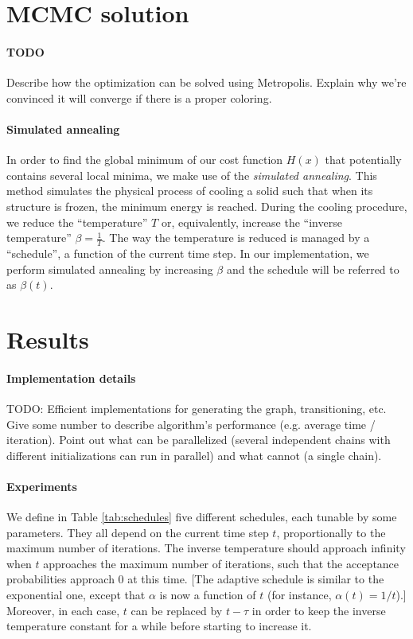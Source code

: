 \documentclass{report}
\begin{document}
  \section*{MCMC solution}
  \paragraph{TODO} Describe how the optimization can be solved using Metropolis. Explain why we're convinced it will converge if there is a proper coloring.

  \paragraph{Simulated annealing}
  In order to find the global minimum of our cost function $H(x)$ that potentially contains several local minima, we make use of the \textit{simulated annealing}. This method simulates the physical process of cooling a solid such that when its structure is frozen, the minimum energy is reached. During the cooling procedure, we reduce the ``temperature'' $T$ or, equivalently, increase the ``inverse temperature'' $\beta=\frac{1}{T}$. The way the temperature is reduced is managed by a ``schedule'', a function of the current time step. In our implementation, we perform simulated annealing by increasing $\beta$ and the schedule will be referred to as $\beta(t)$.

  \section*{Results}
  \paragraph{Implementation details}
  TODO: Efficient implementations for generating the graph, transitioning, etc. Give some number to describe algorithm's performance (e.g. average time / iteration). Point out what can be parallelized (several independent chains with different initializations can run in parallel) and what cannot (a single chain).

  \paragraph{Experiments}  
  We define in Table \ref{tab:schedules} five different schedules, each tunable by some parameters. They all depend on the current time step $t$, proportionally to the maximum number of iterations. The inverse temperature should approach infinity when $t$ approaches the maximum number of iterations, such that the acceptance probabilities approach 0 at this time. [The adaptive schedule is similar to the exponential one, except that $\alpha$ is now a function of $t$ (for instance, $\alpha(t) = 1/t$).] Moreover, in each case, $t$ can be replaced by $t-\tau$ in order to keep the inverse temperature constant for a while before starting to increase it.
  
\end{document}
